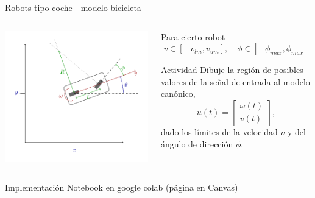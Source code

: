 \documentclass[presentation,aspectratio=169]{beamer}
\begin{document}
\begin{frame}[label={sec:orgd830cee}]{Robots tipo coche - modelo bicicleta}
\begin{columns}
\begin{column}{0.4\columnwidth}
\begin{center}
 \includegraphics[width=1.05\linewidth]{../figures/bicycle-model}
\end{center}
\end{column}

\begin{column}{0.6\columnwidth}
Para cierto robot
\[ v \in [-v_{lm}, v_{um}], \quad \phi \in [-\phi_{max}, \phi_{max}]\]


\pause

\alert{Actividad} Dibuje la región de posibles valores de la señal de entrada al modelo canónico,
\[ u(t) = \begin{bmatrix} \omega(t)\\v(t) \end{bmatrix}, \]
dado los límites de la velocidad \(v\) y del ángulo de dirección \(\phi\).
\end{column}
\end{columns}
\end{frame}


\begin{frame}[label={sec:org5dbd0e6}]{Implementación}
Notebook en google colab (página en Canvas)
\end{frame}
\end{document}
